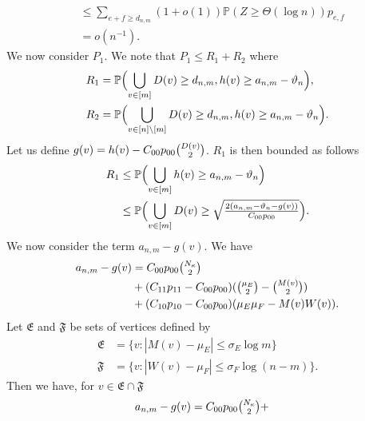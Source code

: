 \documentclass[10pt,journal,compsoc]{IEEEtran}
\theoremstyle{definition}
\begin{document}
\begin{IEEEproof}[Lemma~8]
\begin{IEEEproof}[Eq.~\eqref{eq:27}]
\begin{equation*}
\begin{split}
    &\leq \sum_{e + f \geq d_{n,m}} (1 + o(1))
    \mathbb{P}(Z \geq \Theta(\log{n})) p_{e,f} \\ &= o(n^{-1}).
  \end{split}
\end{equation*}
We now consider $P_1$. We note that $P_1 \leq R_1 + R_2$
where
\begin{align*}
  R_1 &= \mathbb{P}\Bigl(\bigcup_{v \in [m]} D(v) \geq
  d_{n,m}, h(v) \geq a_{n,m} - \vartheta_n \Bigr), \\  
  R_2 &= \mathbb{P}\Bigl(\bigcup_{v \in [n] \setminus [m]} D(v) \geq
  d_{n,m}, h(v) \geq a_{n,m} - \vartheta_n \Bigr).
\end{align*}
Let us define $g(v) = h(v) - C_{00}p_{00} \tbinom{D(v)}{2}$.
$R_1$ is then bounded as follows
\begin{equation}
  \begin{split}
    \label{eq:36}
    R_1 &\leq \mathbb{P}\Bigl( \bigcup_{v \in [m]} h(v) \geq
    a_{n,m} - \vartheta_{n} \Bigr) \\
    &\leq \mathbb{P}\Bigl(\bigcup_{v \in [m]} D(v) \geq
      \sqrt{\tfrac{2 (a_{n,m} - \vartheta_n -
        g(v))}{C_{00} p_{00}}} \Bigr).
  \end{split}
\end{equation}
We now consider the term $a_{n,m} - g(v)$. We have
\begin{equation*}
  \begin{split}
  a_{n,m} - g(v) &= C_{00} p_{00} \tbinom{N_\kappa}{2} \\ &+ (C_{11}p_{11} -
  C_{00} p_{00})(\tbinom{\mu_E}{2} - \tbinom{M(v)}{2})
  \\ &+ (C_{10} p_{10} - C_{00} p_{00})(\mu_E\mu_F - M(v)W(v)).
  \end{split}
\end{equation*}
Let $\mathfrak{E}$ and $\mathfrak{F}$ be sets of vertices defined by
\begin{align}
\mathfrak{E} &=
\{v \colon |M(v) - \mu_E| \leq \sigma_E \log{m}\} \\ \mathfrak{F} &=
\{v \colon |W(v) - \mu_F| \leq \sigma_F \log{(n-m)}\}.
\end{align}
Then we have, for $v \in \mathfrak{E} \cap \mathfrak{F}$
\begin{equation}
  \label{eq:34}
  \begin{split}
  a_{n,m} - g(v) =  C_{00} p_{00} \tbinom{N_\kappa}{2} &+

\end{split}
\end{equation}
\end{IEEEproof}
\end{IEEEproof}
\end{document}
